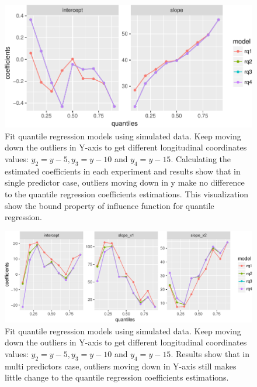 \documentclass[11pt,a4paper,]{article}
\theoremstyle{definition}
\theoremstyle{definition}
\theoremstyle{remark}
\begin{document}
\begin{figure}

{\centering \includegraphics{main_files/figure-latex/move-y2-1} 

}

\caption{Fit quantile regression models using simulated data. Keep moving down the outliers in Y-axis to get different longitudinal coordinates values: $y_{2}=y-5, y_{3}=y-10$ and $y_{4}=y-15$. Calculating the estimated coefficients in each experiment and results show that in single predictor case, outliers moving down in y make no difference to the quantile regression coefficients estimations. This visualization show the bound property of influence function for quantile regression.}\label{fig:move-y2}
\end{figure}

\begin{figure}

{\centering \includegraphics{main_files/figure-latex/move-y-multi1-1} 

}

\caption{Fit quantile regression models using simulated data. Keep moving down the outliers in Y-axis to get different longitudinal coordinates values: $y_{2}=y-5, y_{3}=y-10$ and $y_{4}=y-15$. Results show that in multi predictors case, outliers moving down in Y-axis still makes little change to the quantile regression coefficients estimations.}\label{fig:move-y-multi1}
\end{figure}
\end{document}
